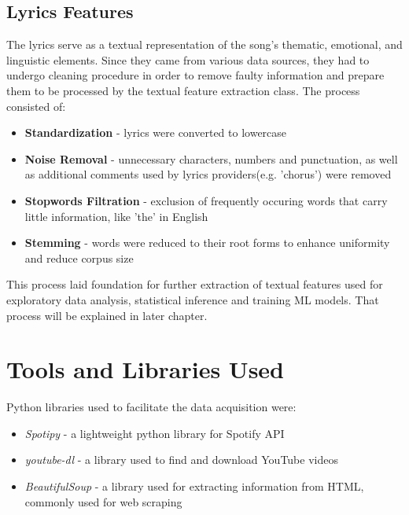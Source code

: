 \subsection{Lyrics Features}
 The lyrics serve as a textual representation of the song's thematic,
 emotional, and linguistic elements. Since they came from various data sources,
 they had  to undergo cleaning procedure in order to remove faulty information
 and prepare them to be processed by the textual feature extraction class. The
 process consisted of:
 \begin{itemize}
  \item \textbf{Standardization} - lyrics were converted to lowercase
  \item \textbf{Noise Removal} - unnecessary characters, numbers and
    punctuation, as well as additional comments used by lyrics providers(e.g.
    'chorus') were removed
  \item \textbf{Stopwords Filtration} - exclusion of frequently occuring words
    that carry little information, like 'the' in English
  \item \textbf{Stemming} - words were reduced to their root forms to enhance
    uniformity and reduce corpus size
 \end{itemize}

 This process laid foundation for further extraction of textual features used
 for exploratory data analysis, statistical inference and training ML models.
 That process will be explained in later chapter.



\section{Tools and Libraries Used}
\label{sec:toolsandlibrariesused}
Python libraries used to facilitate the data acquisition were:
\begin{itemize}
  \item \textit{Spotipy} \cite{spotipy}- a lightweight python library for
    Spotify API
  \item \textit{youtube-dl} \cite{ytdl} - a library used to find and download
    YouTube videos
  \item \textit{BeautifulSoup} \cite{beautifulsoup} - a library used for
    extracting information from HTML, commonly used for web scraping
\end{itemize}



